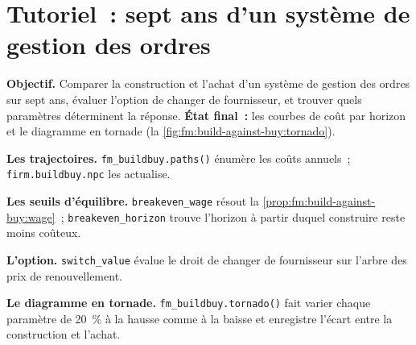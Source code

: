 \section{Tutoriel~: sept ans d'un système de gestion des ordres}\label{tut:fm:build-against-buy:tut}

\begin{tutorial}
\textbf{Objectif.} Comparer la construction et l'achat d'un système de gestion des ordres sur sept ans, évaluer l'option de changer de fournisseur, et trouver quels paramètres
déterminent la réponse. \textbf{État final~:} les courbes de coût par horizon et le diagramme en tornade (la \cref{fig:fm:build-against-buy:tornado}).
\begin{tutsteps}
\item \textbf{Les trajectoires.} \texttt{fm\_buildbuy.paths()} énumère les coûts annuels~; \texttt{firm.buildbuy.npc} les actualise.
\item \textbf{Les seuils d'équilibre.} \texttt{breakeven\_wage} résout la \cref{prop:fm:build-against-buy:wage}~; \texttt{breakeven\_horizon} trouve l'horizon à partir duquel
construire reste moins coûteux.
\item \textbf{L'option.} \texttt{switch\_value} évalue le droit de changer de fournisseur sur l'arbre des prix de renouvellement.
\item \textbf{Le diagramme en tornade.} \texttt{fm\_buildbuy.tornado()} fait varier chaque paramètre de 20~\% à la hausse comme à la baisse et enregistre l'écart entre la construction et l'achat.
\end{tutsteps}
\end{tutorial}

